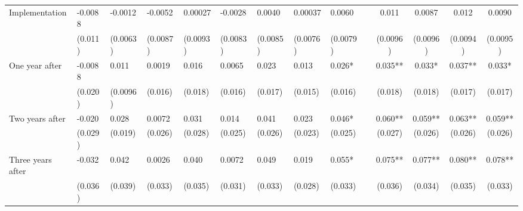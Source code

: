 \begin{tabular}{lccccrrrrrcccc}
Implementation & \multicolumn{1}{l}{-0.0088} & \multicolumn{1}{l}{-0.0012} & \multicolumn{1}{l}{-0.0052} & \multicolumn{1}{l}{0.00027} & \multicolumn{1}{l}{-0.0028} & \multicolumn{1}{l}{0.0040} & \multicolumn{1}{l}{0.00037} & \multicolumn{1}{l}{0.0060} &       & 0.011 & 0.0087 & 0.012 & 0.0090 \\
      & \multicolumn{1}{l}{(0.011)} & \multicolumn{1}{l}{(0.0063)} & \multicolumn{1}{l}{(0.0087)} & \multicolumn{1}{l}{(0.0093)} & \multicolumn{1}{l}{(0.0083)} & \multicolumn{1}{l}{(0.0085)} & \multicolumn{1}{l}{(0.0076)} & \multicolumn{1}{l}{(0.0079)} &       & (0.0096) & (0.0096) & (0.0094) & (0.0095) \\
One year after & \multicolumn{1}{l}{-0.0088} & \multicolumn{1}{l}{0.011} & \multicolumn{1}{l}{0.0019} & \multicolumn{1}{l}{0.016} & \multicolumn{1}{l}{0.0065} & \multicolumn{1}{l}{0.023} & \multicolumn{1}{l}{0.013} & \multicolumn{1}{l}{0.026*} &       & 0.035** & 0.033* & 0.037** & 0.033* \\
      & \multicolumn{1}{l}{(0.020)} & \multicolumn{1}{l}{(0.0096)} & \multicolumn{1}{l}{(0.016)} & \multicolumn{1}{l}{(0.018)} & \multicolumn{1}{l}{(0.016)} & \multicolumn{1}{l}{(0.017)} & \multicolumn{1}{l}{(0.015)} & \multicolumn{1}{l}{(0.016)} &       & (0.018) & (0.018) & (0.017) & (0.017) \\
Two years after & \multicolumn{1}{l}{-0.020} & \multicolumn{1}{l}{0.028} & \multicolumn{1}{l}{0.0072} & \multicolumn{1}{l}{0.031} & \multicolumn{1}{l}{0.014} & \multicolumn{1}{l}{0.041} & \multicolumn{1}{l}{0.023} & \multicolumn{1}{l}{0.046*} &       & 0.060** & 0.059** & 0.063** & 0.059** \\
      & \multicolumn{1}{l}{(0.029)} & \multicolumn{1}{l}{(0.019)} & \multicolumn{1}{l}{(0.026)} & \multicolumn{1}{l}{(0.028)} & \multicolumn{1}{l}{(0.025)} & \multicolumn{1}{l}{(0.026)} & \multicolumn{1}{l}{(0.023)} & \multicolumn{1}{l}{(0.025)} &       & (0.027) & (0.026) & (0.026) & (0.026) \\
Three years after & \multicolumn{1}{l}{-0.032} & \multicolumn{1}{l}{0.042} & \multicolumn{1}{l}{0.0026} & \multicolumn{1}{l}{0.040} & \multicolumn{1}{l}{0.0072} & \multicolumn{1}{l}{0.049} & \multicolumn{1}{l}{0.019} & \multicolumn{1}{l}{0.055*} &       & 0.075** & 0.077** & 0.080** & 0.078** \\
      & \multicolumn{1}{l}{(0.036)} & \multicolumn{1}{l}{(0.039)} & \multicolumn{1}{l}{(0.033)} & \multicolumn{1}{l}{(0.035)} & \multicolumn{1}{l}{(0.031)} & \multicolumn{1}{l}{(0.033)} & \multicolumn{1}{l}{(0.028)} & \multicolumn{1}{l}{(0.033)} &       & (0.036) & (0.034) & (0.035) & (0.033) \\

\end{tabular}
